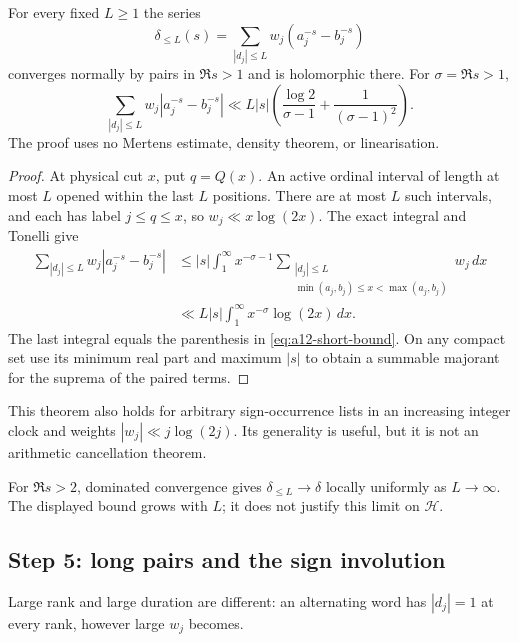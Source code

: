 \begin{theorem}
\label{thm:a12-short}
For every fixed $L\ge1$ the series
\begin{equation}
\label{eq:a12-short}
\delta_{\le L}(s)=\sum_{|d_j|\le L}w_j(a_j^{-s}-b_j^{-s})
\end{equation}
converges normally by pairs in $\Re s>1$ and is holomorphic there.
For $\sigma=\Re s>1$,
\begin{equation}
\label{eq:a12-short-bound}
\sum_{|d_j|\le L}w_j|a_j^{-s}-b_j^{-s}|
\ll L|s|\left(\frac{\log2}{\sigma-1}+\frac1{(\sigma-1)^2}\right).
\end{equation}
The proof uses no Mertens estimate, density theorem, or linearisation.
\end{theorem}
\begin{proof}
At physical cut $x$, put $q=Q(x)$. An active ordinal interval of length
at most $L$ opened within the last $L$ positions. There are at most $L$
such intervals, and each has label $j\le q\le x$, so
$w_j\ll x\log(2x)$. The exact integral and Tonelli give
\begin{align}
\sum_{|d_j|\le L}w_j|a_j^{-s}-b_j^{-s}|
&\le |s|\int_1^\infty x^{-\sigma-1}
\sum_{\substack{|d_j|\le L\\\min(a_j,b_j)\le x<\max(a_j,b_j)}}w_j\,dx
\label{eq:a12-short-majorant}\\
&\ll L|s|\int_1^\infty x^{-\sigma}\log(2x)\,dx.
\nonumber
\end{align}
The last integral equals the parenthesis in \eqref{eq:a12-short-bound}.
On any compact set use its minimum real part and maximum $|s|$ to obtain
a summable majorant for the suprema of the paired terms.
\end{proof}

This theorem also holds for arbitrary sign-occurrence lists in an
increasing integer clock and weights $|w_j|\ll j\log(2j)$.
Its generality is useful, but it is not an arithmetic cancellation theorem.

For $\Re s>2$, dominated convergence gives
$\delta_{\le L}\to\delta$ locally uniformly as $L\to\infty$.
The displayed bound grows with $L$; it does not justify this limit on
$\mathcal H$.

\subsection{Step 5: long pairs and the sign involution}
\label{subsec:a12-long-pairs}
Large rank and large duration are different: an alternating word has
$|d_j|=1$ at every rank, however large $w_j$ becomes.

